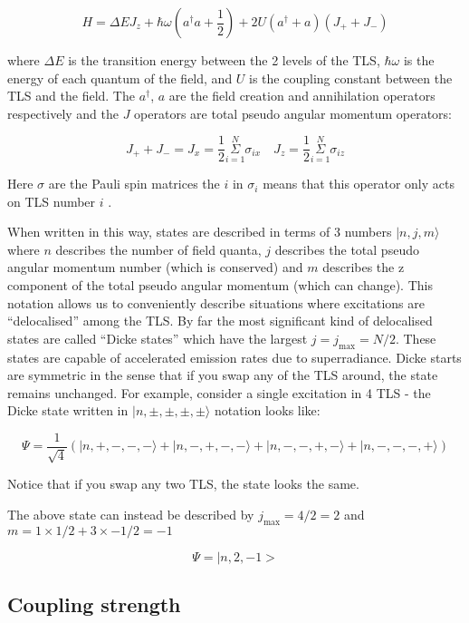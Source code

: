 \documentclass[
]{article}
\renewcommand{\[}{\begin{equation}}
\renewcommand{\]}{\end{equation}}
\begin{document}
\[
H =  \Delta E J_{z} + \hbar\omega\left(a^{\dagger}a +\frac{1}{2}\right) + 2U\left( a^{\dagger} + a \right)(J_{+} + J_{-})
\label{eq:dickeHpseudo}
\]

where \(\Delta E\) is the transition energy between the 2 levels of the
TLS, \(\hbar\omega\) is the energy of each quantum of the field, and
\(U\) is the coupling constant between the TLS and the field. The
\(a^{\dagger}\), \(a\) are the field creation and annihilation operators
respectively and the \(J\) operators are total pseudo angular momentum
operators:

\[
J_{+} + J_{-} = J_{x} = \frac{1}{2}\overset{N}{\underset{i=1}{\Sigma}} \sigma_{i x} \,\,\,\,\,\, J_{z} = \frac{1}{2}\overset{N}{\underset{i=1}{\Sigma}} \sigma_{i z}
\]

Here \(\sigma\) are the Pauli spin matrices the \(i\) in \(\sigma_i\)
means that this operator only acts on TLS number \(i\) .

When written in this way, states are described in terms of 3 numbers
\(|n, j, m\rangle\) where \(n\) describes the number of field quanta,
\(j\) describes the total pseudo angular momentum number (which is
conserved) and \(m\) describes the z component of the total pseudo
angular momentum (which can change). This notation allows us to
conveniently describe situations where excitations are ``delocalised''
among the TLS. By far the most significant kind of delocalised states
are called ``Dicke states'' which have the largest \(j=j_{\max} = N/2\).
These states are capable of accelerated emission rates due to
superradiance. Dicke starts are symmetric in the sense that if you swap
any of the TLS around, the state remains unchanged. For example,
consider a single excitation in 4 TLS - the Dicke state written in
\(|n,\pm,\pm, \pm, \pm\rangle\) notation looks like:

\[
\Psi = \frac{1}{\sqrt{4}}\left(| n, +, -, -, - \rangle + | n, -, +, -, - \rangle + | n, -, -, +, - \rangle + | n, -, -, -, + \rangle \right)
\]

Notice that if you swap any two TLS, the state looks the same.

The above state can instead be described by \(j_{\max}= 4/2  = 2\) and
\(m = 1\times 1/2 + 3\times -1/2 =-1\)

\[
\Psi = |n,2,-1>
\]

\subsection{Coupling strength}\label{coupling-strength}
\end{document}
